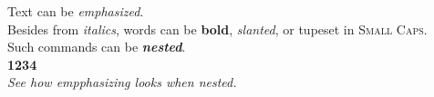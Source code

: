 \documentclass{article}
\begin{document}
\noindent Text can be \emph{emphasized}.\\
Besides from \textit{italics}, words can be \textbf{bold}, \textsl{slanted}, or tupeset in \textsc{Small Caps}.\\
Such commands can be \textit{\textbf{nested}}.\\
\textbf{\textbf{1234}}\\
\emph{See how \emph{empphasizing} looks when nested.}
\end{document}
